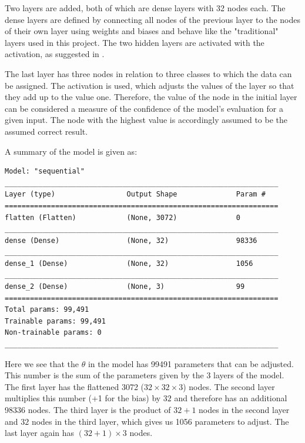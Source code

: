 Two layers are added, both of which are dense layers with 32 nodes each.
The dense layers are defined by connecting all nodes of the previous layer to the nodes of their own layer using weights and biases and behave like the "traditional" layers used in this project.
The two hidden layers are activated with the  activation, as suggested in \cite[p.168]{Goodfellow2017}.

The last layer has three nodes in relation to three classes to which the data can be assigned.
The activation  is used, which adjusts the values of the layer so that they add up to the value one.
Therefore, the value of the node in the initial layer can be considered a measure of the confidence of the model's evaluation for a given input.
The node with the highest value is accordingly assumed to be the assumed correct result.

A summary of the model is given as:

\begin{lstlisting}
Model: "sequential"
_________________________________________________________________
Layer (type)                 Output Shape              Param #   
=================================================================
flatten (Flatten)            (None, 3072)              0         
_________________________________________________________________
dense (Dense)                (None, 32)                98336     
_________________________________________________________________
dense_1 (Dense)              (None, 32)                1056      
_________________________________________________________________
dense_2 (Dense)              (None, 3)                 99        
=================================================================
Total params: 99,491
Trainable params: 99,491
Non-trainable params: 0
_________________________________________________________________
\end{lstlisting}

Here we see that the $\theta$ in the model has 99491 parameters that can be adjusted.
This number is the sum of the parameters given by the 3 layers of the model.
The first layer has the flattened 3072 ($32 \times 32 \times 3$) nodes.
The second layer multiplies this number (+1 for the bias) by $32$ and therefore has an additional 98336 nodes.
The third layer is the product of $32 + 1$ nodes in the second layer and $32$ nodes in the third layer, which gives us 1056 parameters to adjust.
The last layer again has $(32 + 1) \times 3$ nodes.

